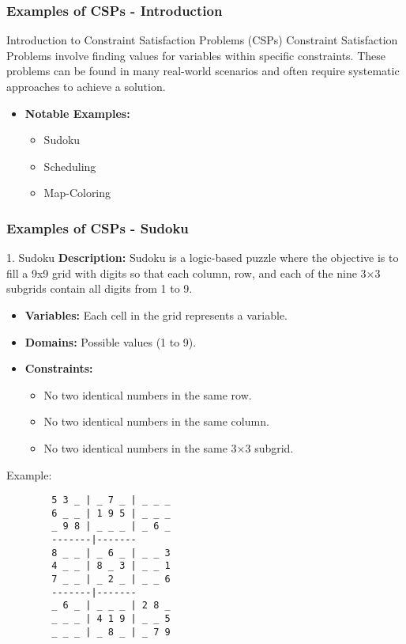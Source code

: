 \documentclass[aspectratio=169]{beamer}
\begin{document}
\begin{frame}[fragile]
    \frametitle{Examples of CSPs - Introduction}
    \begin{block}{Introduction to Constraint Satisfaction Problems (CSPs)}
        Constraint Satisfaction Problems involve finding values for variables within specific constraints. These problems can be found in many real-world scenarios and often require systematic approaches to achieve a solution. 
    \end{block}
    \begin{itemize}
        \item \textbf{Notable Examples:}
        \begin{itemize}
            \item Sudoku
            \item Scheduling
            \item Map-Coloring
        \end{itemize}
    \end{itemize}
\end{frame}

\begin{frame}[fragile]
    \frametitle{Examples of CSPs - Sudoku}
    \begin{block}{1. Sudoku}
        \textbf{Description:} 
        Sudoku is a logic-based puzzle where the objective is to fill a 9x9 grid with digits so that each column, row, and each of the nine 3×3 subgrids contain all digits from 1 to 9.
    \end{block}
    
    \begin{itemize}
        \item \textbf{Variables:} Each cell in the grid represents a variable.
        \item \textbf{Domains:} Possible values (1 to 9).
        \item \textbf{Constraints:}
        \begin{itemize}
            \item No two identical numbers in the same row.
            \item No two identical numbers in the same column.
            \item No two identical numbers in the same 3×3 subgrid.
        \end{itemize}
    \end{itemize}

    \begin{block}{Example:}
        \begin{lstlisting}
        5 3 _ | _ 7 _ | _ _ _
        6 _ _ | 1 9 5 | _ _ _
        _ 9 8 | _ _ _ | _ 6 _
        -------|-------
        8 _ _ | _ 6 _ | _ _ 3
        4 _ _ | 8 _ 3 | _ _ 1
        7 _ _ | _ 2 _ | _ _ 6
        -------|-------
        _ 6 _ | _ _ _ | 2 8 _
        _ _ _ | 4 1 9 | _ _ 5
        _ _ _ | _ 8 _ | _ 7 9
        \end{lstlisting}
    \end{block}
\end{frame}
\end{document}
